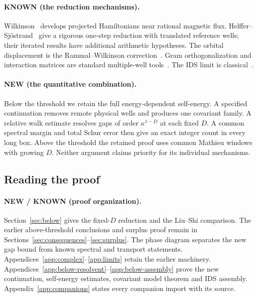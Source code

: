 \paragraph{KNOWN (the reduction mechanisms).}
Wilkinson~\cite{Wilkinson1987} develops projected Hamiltonians near rational magnetic flux. Helffer--Sj\"ostrand~\cite[Section~5.1]{HSII} give a rigorous one-step reduction with translated reference wells; their iterated results have additional arithmetic hypotheses. The orbital displacement is the Rammal--Wilkinson correction~\cite{RammalBellissard,BellissardBarelli}. Gram orthogonalization and interaction matrices are standard multiple-well tools~\cite[Sections~2.1--2.2 and 3.2]{HSwells}. The IDS limit is classical~\cite{AvronSimon}.

\paragraph{NEW (the quantitative combination).}
Below the threshold we retain the full energy-dependent self-energy. A specified continuation removes remote physical wells and produces one covariant family. A relative walk estimate resolves gaps of order $\kappa^{1-D}$ at each fixed $D$. A common spectral margin and total Schur error then give an exact integer count in every long box. Above the threshold the retained proof uses common Mathieu windows with growing $D$. Neither argument claims priority for its individual mechanisms.

\subsection{Reading the proof}
\paragraph{NEW / KNOWN (proof organization).}
Section~\ref{sec:below} gives the fixed-$D$ reduction and the Liu--Shi comparison. The earlier above-threshold conclusions and surplus proof remain in Sections~\ref{sec:consequences}--\ref{sec:surplus}. The phase diagram separates the new gap bound from known spectral and transport statements. Appendices~\ref{app:complex}--\ref{app:limits} retain the earlier machinery. Appendices~\ref{app:below-resolvent}--\ref{app:below-assembly} prove the new continuation, self-energy estimates, covariant model theorem and IDS assembly. Appendix~\ref{app:companions} states every companion import with its source.
\label{end:intro}
